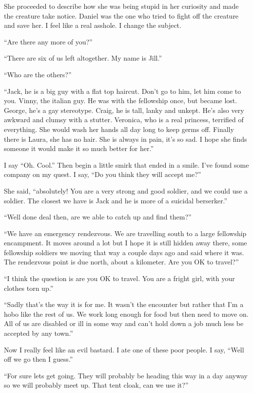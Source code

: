 She proceeded to describe how she was being stupid in her curiosity and made the creature take notice. Daniel was the one who tried to fight off the creature and save her. I feel like a real asshole. I change the subject.

``Are there any more of you?''

``There are six of us left altogether. My name is Jill.''

``Who are the others?''

``Jack, he is a big guy with a flat top haircut. Don't go to him, let him come to you. Vinny, the italian guy. He was with the fellowship once, but became lost. George, he's a gay stereotype. Craig, he is tall, lanky and unkept. He's also very awkward and clumsy with a stutter. Veronica, who is a real princess, terrified of everything. She would wash her hands all day long to keep germs off. Finally there is Laura, she has no hair. She is always in pain, it's so sad. I hope she finds someone it would make it so much better for her.''

I say ``Oh. Cool.'' Then begin a little smirk that ended in a smile. I've found some company on my quest. I say, ``Do you think they will accept me?''

She said, ``absolutely! You are a very strong and good soldier, and we could use a soldier. The closest we have is Jack and he is more of a suicidal berserker.''

``Well done deal then, are we able to catch up and find them?''

``We have an emergency rendezvous. We are travelling south to a large fellowship encampment. It moves around a lot but I hope it is still hidden away there, some fellowship soldiers we moving that way a couple days ago and said where it was. The rendezvous point is due north, about a kilometer. Are you OK to travel?''

``I think the question is are you OK to travel. You are a fright girl, with your clothes torn up.''

``Sadly that's the way it is for me. It wasn't the encounter but rather that I'm a hobo like the rest of us. We work long enough for food but then need to move on. All of us are disabled or ill in some way and can't hold down a job much less be accepted by any town.''

Now I really feel like an evil bastard. I ate one of these poor people. I say, ``Well off we go then I guess.''

``For sure lets get going. They will probably be heading this way in a day anyway so we will probably meet up. That tent cloak, can we use it?''

